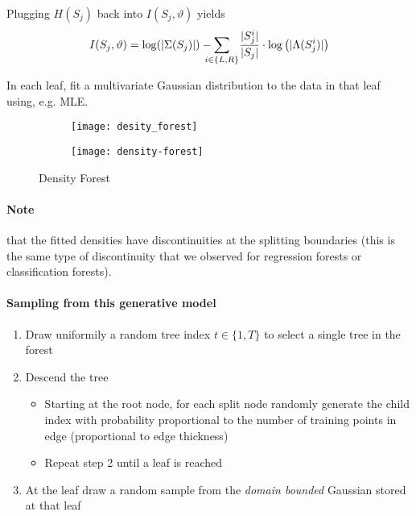 Plugging \(H(S_j)\) back into \(I(S_j, \vartheta)\) yields
\[I(S_j, \vartheta) = \log (|\Sigma(S_j)|) - \sum_{\mathclap{i \in \{L, R\}}}\ \ \frac{|S_j^i|}{|S_j|} \cdot \log\left(|\Lambda(S_j^i)|\right)\]

In each leaf, fit a multivariate Gaussian distribution to the data in that leaf using, e.g. MLE.

\begin{figure}[H]
  \centering
  \begin{subfigure}[c]{0.45\textwidth}
    \centering
    \texttt{[image: desity\_forest]}
  \end{subfigure}
  \hfill
  \begin{subfigure}[c]{0.45\textwidth}
    \centering
    \texttt{[image: density-forest]}
  \end{subfigure}
  \caption{Density Forest}
\end{figure}

\paragraph{Note} that the fitted densities have discontinuities at the splitting boundaries (this is the same type of discontinuity that we observed for regression forests or classification forests).

\paragraph{Sampling from this generative model}
\begin{enumerate}
    \item Draw uniformily a random tree index \(t \in \{1, T\}\) to select a single tree in the forest
    \item Descend the tree
        \begin{itemize}
            \item Starting at the root node, for each split node randomly generate the child index with probability proportional to the number of training points in edge (proportional to edge thickness)
            \item Repeat step 2 until a leaf is reached
        \end{itemize}
    \item At the leaf draw a random sample from the \textit{domain bounded} Gaussian stored at that leaf
\end{enumerate}

